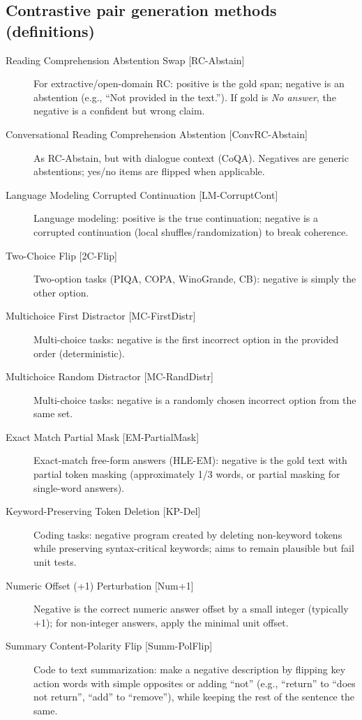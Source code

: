 \documentclass{article}
\begin{document}
\subsection*{Contrastive pair generation methods (definitions)}
\begin{description}
  \item[Reading Comprehension Abstention Swap \textnormal{[RC-Abstain]}] For extractive/open-domain RC: positive is the gold span; negative is an abstention (e.g., ``Not provided in the text.''). If gold is \emph{No answer}, the negative is a confident but wrong claim.
  \item[Conversational Reading Comprehension Abstention \textnormal{[ConvRC-Abstain]}] As RC-Abstain, but with dialogue context (CoQA). Negatives are generic abstentions; yes/no items are flipped when applicable.
  \item[Language Modeling Corrupted Continuation \textnormal{[LM-CorruptCont]}] Language modeling: positive is the true continuation; negative is a corrupted continuation (local shuffles/randomization) to break coherence.
  \item[Two-Choice Flip \textnormal{[2C-Flip]}] Two-option tasks (PIQA, COPA, WinoGrande, CB): negative is simply the other option.
  \item[Multichoice First Distractor \textnormal{[MC-FirstDistr]}] Multi-choice tasks: negative is the first incorrect option in the provided order (deterministic).
  \item[Multichoice Random Distractor \textnormal{[MC-RandDistr]}] Multi-choice tasks: negative is a randomly chosen incorrect option from the same set.
  \item[Exact Match Partial Mask \textnormal{[EM-PartialMask]}] Exact-match free-form answers (HLE-EM): negative is the gold text with partial token masking (approximately 1/3 words, or partial masking for single-word answers).
  \item[Keyword-Preserving Token Deletion \textnormal{[KP-Del]}] Coding tasks: negative program created by deleting non-keyword tokens while preserving syntax-critical keywords; aims to remain plausible but fail unit tests.
  \item[Numeric Offset (+1) Perturbation \textnormal{[Num+1]}] Negative is the correct numeric answer offset by a small integer (typically +1); for non-integer answers, apply the minimal unit offset.
  \item[Summary Content-Polarity Flip \textnormal{[Summ-PolFlip]}] Code to text summarization: make a negative description by flipping key action words with simple opposites or adding “not” (e.g., “return” to “does not return”, “add” to “remove”), while keeping the rest of the sentence the same.

\end{description}
\end{document}
